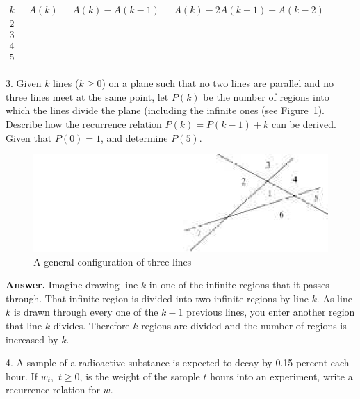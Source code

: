 \documentclass[10pt,]{book}
\theoremstyle{plain}
\theoremstyle{definition}
\theoremstyle{definition}
\theoremstyle{definition}
\theoremstyle{definition}
\numberwithin{equation}{section}
\begin{document}
\begin{exercisegroup}
\begin{enumerate}[label=\alph*]
 \(\begin{array}{cccc}
 k & \text{  }A(k)\text{       } & A(k)-A(k-1)\text{       } & A(k)-2A(k-1)+A(k-2) \\
 2 &   &   &   \\
 3 &   &   &   \\
 4 &   &   &   \\
 5 &   &   &   \\
\end{array}\)
%
\end{enumerate}
%
\par\smallskip
\item[3.]\hypertarget{exercise-9}{} Given \(k\) lines (\(k\geq 0\)) on a plane such that no two lines are parallel and no three lines meet at the same point, let \(P(k)\)
be the number of regions into which the lines divide the plane (including the infinite ones (see \hyperref[exercise-8-2-3]{Figure~\ref{exercise-8-2-3}}). Describe how the recurrence
relation \(P(k) = P(k - 1) + k\) can be derived. Given that \(P(0) = 1\), and determine \(P(5)\).
%
\leavevmode%
\begin{figure}
\centering
\includegraphics[width=1\linewidth]{images/exercise-8-2-3.png}
\caption{A general configuration of three lines\label{exercise-8-2-3}}
\end{figure}
\par\smallskip
\par\smallskip
\noindent\textbf{Answer.}\hypertarget{answer-5}{}\quad
Imagine drawing line \(k\) in one of the infinite regions that it passes through. That infinite region is divided into two infinite regions by line \(k\). As line \(k\) is drawn through every one of the \(k-1\) previous lines, you enter another region that line \(k\) divides. Therefore \(k\) regions are divided and the number of regions is increased by \(k\). %
\item[4.]\hypertarget{exercise-10}{} A sample of a radioactive substance is expected to decay by 0.15 percent each hour. If \(w_t,\) \(t \geq  0\), is the weight of the sample
\(t\) hours into an experiment, write a recurrence relation for \(w\).%
\par\smallskip
\end{exercisegroup}
\end{document}
